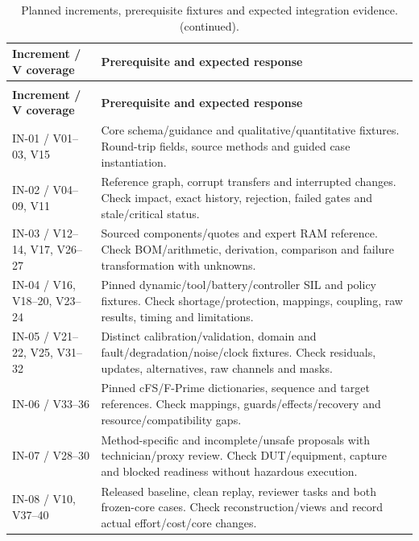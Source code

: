 {\small
\setlength{\tabcolsep}{4pt}
\setlength{\parskip}{0pt}
\setlength{\LTpre}{0.4\baselineskip}
\setlength{\LTpost}{0.4\baselineskip}
\renewcommand{\arraystretch}{1.06}
\begin{longtable}{@{}>{\raggedright\arraybackslash}p{}>{\raggedright\arraybackslash}p{}@{}}
\caption{Planned increments, prerequisite fixtures and expected integration evidence.}\label{tab:framework-verification-increments}\\
\toprule
\textbf{Increment / V coverage} & \textbf{Prerequisite and expected response} \\
\midrule
\endfirsthead
\caption[]{Planned increments, prerequisite fixtures and expected integration evidence. (continued).}\\
\toprule
\textbf{Increment / V coverage} & \textbf{Prerequisite and expected response} \\
\midrule
\endhead
\bottomrule
\endfoot
IN-01 / V01--03, V15 & Core schema/guidance and qualitative/quantitative fixtures. Round-trip fields, source methods and guided case instantiation. \\
IN-02 / V04--09, V11 & Reference graph, corrupt transfers and interrupted changes. Check impact, exact history, rejection, failed gates and stale/critical status. \\
IN-03 / V12--14, V17, V26--27 & Sourced components/quotes and expert RAM reference. Check BOM/arithmetic, derivation, comparison and failure transformation with unknowns. \\
IN-04 / V16, V18--20, V23--24 & Pinned dynamic/tool/battery/controller SIL and policy fixtures. Check shortage/protection, mappings, coupling, raw results, timing and limitations. \\
IN-05 / V21--22, V25, V31--32 & Distinct calibration/validation, domain and fault/degradation/noise/clock fixtures. Check residuals, updates, alternatives, raw channels and masks. \\
IN-06 / V33--36 & Pinned cFS/F-Prime dictionaries, sequence and target references. Check mappings, guards/effects/recovery and resource/compatibility gaps. \\
IN-07 / V28--30 & Method-specific and incomplete/unsafe proposals with technician/proxy review. Check DUT/equipment, capture and blocked readiness without hazardous execution. \\
IN-08 / V10, V37--40 & Released baseline, clean replay, reviewer tasks and both frozen-core cases. Check reconstruction/views and record actual effort/cost/core changes. \\
\end{longtable}
}

